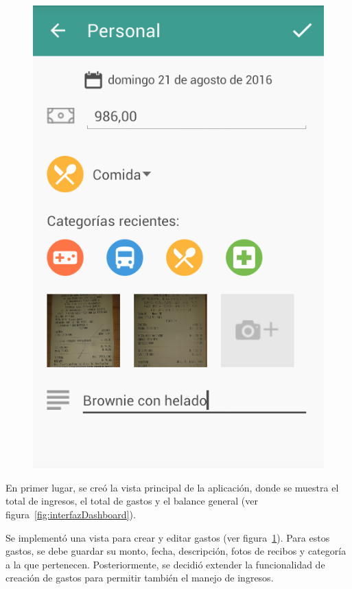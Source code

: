 \begin{figure}[ht]
\begin{minipage}{.5\textwidth}
  \includegraphics[scale=0.4,type=png,ext=.png,read=.png]{imagenes/create_entry}
  \captionsetup{justification=centering}
  \label{fig:interfazCrearEntry}
\end{minipage}
\end{figure}


En primer lugar, se creó la vista principal de la aplicación, donde se muestra el total de ingresos, el total de gastos y el balance general (ver figura~\ref{fig:interfazDashboard}).

Se implementó una vista para crear y editar gastos (ver figura~\ref{fig:interfazCrearEntry}). Para estos gastos, se debe guardar su monto, fecha, descripción, fotos de recibos y categoría a la que pertenecen. Posteriormente, se decidió extender la funcionalidad de creación de gastos para permitir también el manejo de ingresos. 

